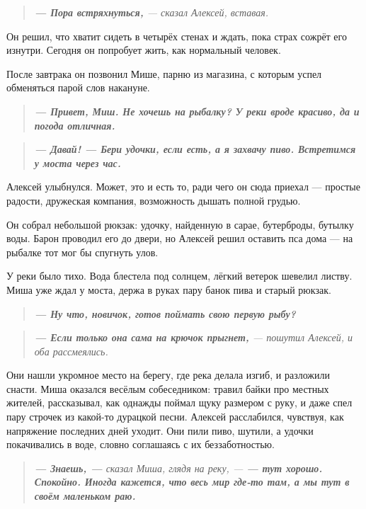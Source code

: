 \documentclass[12pt,a4paper]{book}
\newenvironment{dialogue}{\begin{quote}\itshape}{\end{quote}}
\begin{document}
\begin{dialogue}
\textbf{--- Пора встряхнуться,} --- сказал Алексей, вставая.
\end{dialogue}

Он решил, что хватит сидеть в четырёх стенах и ждать, пока страх сожрёт его изнутри. Сегодня он попробует жить, как нормальный человек.

После завтрака он позвонил Мише, парню из магазина, с которым успел обменяться парой слов накануне.

\begin{dialogue}
\textbf{--- Привет, Миш. Не хочешь на рыбалку? У реки вроде красиво, да и погода отличная.}
\end{dialogue}

\begin{dialogue}
\textbf{--- Давай! --- Бери удочки, если есть, а я захвачу пиво. Встретимся у моста через час.}
\end{dialogue}

Алексей улыбнулся. Может, это и есть то, ради чего он сюда приехал --- простые радости, дружеская компания, возможность дышать полной грудью.

Он собрал небольшой рюкзак: удочку, найденную в сарае, бутерброды, бутылку воды. Барон проводил его до двери, но Алексей решил оставить пса дома --- на рыбалке тот мог бы спугнуть улов.

У реки было тихо. Вода блестела под солнцем, лёгкий ветерок шевелил листву. Миша уже ждал у моста, держа в руках пару банок пива и старый рюкзак.

\begin{dialogue}
\textbf{--- Ну что, новичок, готов поймать свою первую рыбу?}
\end{dialogue}

\begin{dialogue}
\textbf{--- Если только она сама на крючок прыгнет,} --- пошутил Алексей, и оба рассмеялись.
\end{dialogue}

Они нашли укромное место на берегу, где река делала изгиб, и разложили снасти. Миша оказался весёлым собеседником: травил байки про местных жителей, рассказывал, как однажды поймал щуку размером с руку, и даже спел пару строчек из какой-то дурацкой песни. Алексей расслабился, чувствуя, как напряжение последних дней уходит. Они пили пиво, шутили, а удочки покачивались в воде, словно соглашаясь с их беззаботностью.

\begin{dialogue}
\textbf{--- Знаешь, ---} сказал Миша, глядя на реку, --- \textbf{--- тут хорошо. Спокойно. Иногда кажется, что весь мир где-то там, а мы тут в своём маленьком раю.}
\end{dialogue}
\end{document}
